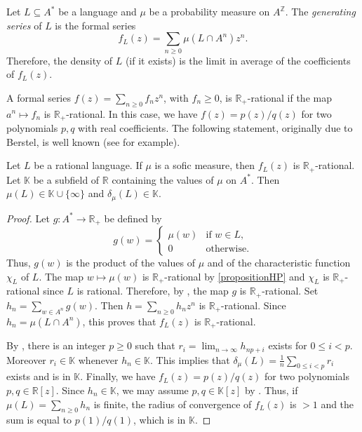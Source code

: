 \documentclass[a4paper,UKenglish,numberwithinsect,cleveref]{lipics-v2021}
\newcommand{\Z}{\mathbb{Z}}
\newcommand{\R}{\mathbb{R}}
\newcommand{\K}{\mathbb{K}}
\begin{document}
Let $L\subseteq A^*$ be a language and $\mu$ be a probability measure on $A^\Z$. The \emph{generating series} of $L$ is the formal series
\[
    f_L(z)=\sum_{n\ge 0}\mu(L\cap A^n)z^n.
\]
Therefore, the density of $L$ (if it exists) is the limit in average of the coefficients of $f_L(z)$.

A formal series $f(z)=\sum_{n\ge 0}f_nz^n$, with $f_n\ge 0$, is $\R_+$-rational if the map $a^n\mapsto f_n$ is $\R_+$-rational. In this case, we have $f(z)=p(z)/q(z)$ for two polynomials $p,q$ with real coefficients. The following statement, originally due to Berstel, is well known (see \cite{Eilenberg1974} for example).
\begin{proposition}\label{propositionBerstel}
    Let $L$ be a rational language. If $\mu$ is a sofic measure, then $f_L(z)$ is $\R_+$-rational. Let $\K$ be a subfield of $\R$ containing the values of $\mu$ on $A^*$. Then $\mu(L)\in \K\cup\{\infty\}$ and $\delta_\mu(L)\in \K$.
\end{proposition}

\begin{proof}
    Let $g\colon A^*\to \R_+$ be defined by 
    \[
        g(w)=\begin{cases}
            \mu(w) & \mbox{if $w\in L$,}\\
            0 & \mbox{otherwise.}
        \end{cases}
    \]
    Thus, $g(w)$ is the product of the values of $\mu$ and of the characteristic function $\chi_L$ of $L$.  The map $w\mapsto\mu(w)$ is $\R_+$-rational by \cref{propositionHP} and $\chi_L$ is $\R_+$-rational since $L$ is rational. Therefore, by \cite[Theorem 5.2]{Eilenberg1974}, the map $g$ is $\R_+$-rational. Set $h_n=\sum_{w\in A^n}g(w)$. Then $h=\sum_{n\ge 0}h_nz^n$ is $\R_+$-rational. Since $h_n=\mu(L\cap A^n)$, this proves that $f_L(z)$ is $\R_+$-rational.

    By \cite[Theorem 7.2]{Eilenberg1974}, there is an integer $p\ge 0$ such that $r_i=\lim_{n\to\infty}h_{np+i}$ exists for $0\le i<p$. Moreover $r_i\in \K$ whenever $h_n\in \K$. This implies that $\delta_\mu(L)=\frac{1}{n}\sum_{0\le i<p}r_i$ exists and is in $\K$. Finally, we have $f_L(z)=p(z)/q(z)$ for two polynomials $p,q\in \R[z]$. Since $h_n\in \K$, we may assume $p,q\in \K[z]$ by \cite[Proposition 3.2]{Eilenberg1974}. Thus, if $\mu(L)=\sum_{n\ge 0}h_n$ is finite, the radius of convergence of $f_L(z)$ is $>1$ and the sum  is equal to $p(1)/q(1)$, which is in $\K$.
\end{proof}
\end{document}
